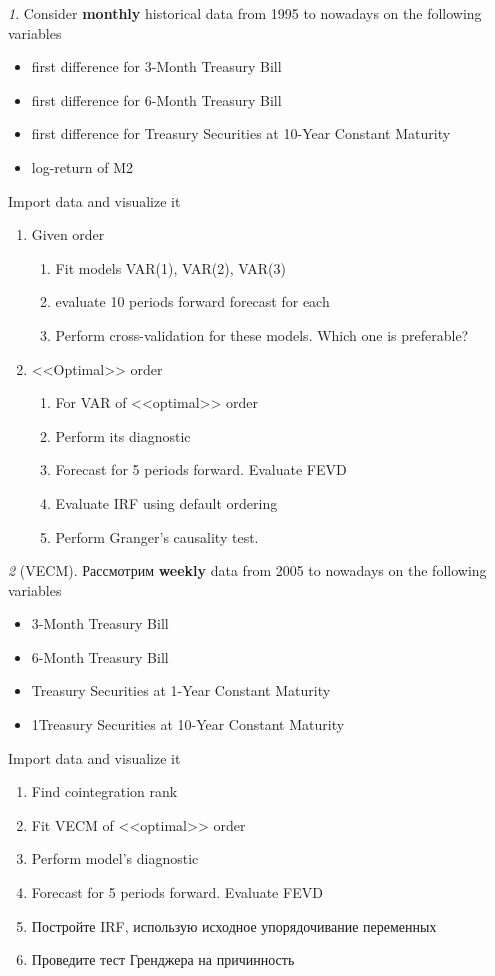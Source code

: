 \documentclass[12pt]{article}
\theoremstyle{remark}
\newtheorem{exercise}{}[section]
\begin{document}
\begin{exercise}
Consider \textbf{monthly} historical data from 1995 to nowadays on the following variables
\begin{itemize}
	\item first difference for 3-Month Treasury Bill
	\item first difference for 6-Month Treasury Bill
	\item first difference for Treasury Securities at 10-Year Constant Maturity
	\item log-return of M2
\end{itemize}
Import data and visualize it
\begin{enumerate}
	\item Given order
	\begin{enumerate}
		\item Fit models VAR(1), VAR(2), VAR(3)
		\item evaluate 10 periods forward forecast for each 
		\item Perform cross-validation for these models. Which one is preferable?
	\end{enumerate}
	\item <<Optimal>> order
	\begin{enumerate}
		\item For VAR of <<optimal>> order
		\item Perform its diagnostic
		\item Forecast for 5 periods forward. Evaluate FEVD
		\item Evaluate IRF using default ordering
		\item Perform Granger's causality test.
	\end{enumerate}
\end{enumerate}
\end{exercise}

\begin{exercise}[VECM]
Рассмотрим \textbf{weekly} data from 2005 to nowadays on the following variables
\begin{itemize}
	\item 3-Month Treasury Bill
	\item 6-Month Treasury Bill
	\item Treasury Securities at 1-Year Constant Maturity
	\item 1Treasury Securities at 10-Year Constant Maturity
\end{itemize}
Import data and visualize it
\begin{enumerate}
	\item Find cointegration rank
	\item Fit VECM of <<optimal>> order
	\item Perform model's diagnostic
	\item Forecast for 5 periods forward. Evaluate FEVD
	\item Постройте IRF, использую исходное упорядочивание переменных
	\item Проведите тест Гренджера на причинность
\end{enumerate}
\end{exercise}
	
\end{document}
